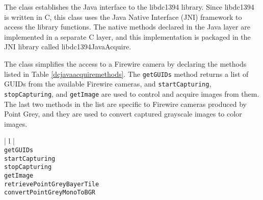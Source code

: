 The \DCJavaAcquire{} class establishes the Java interface to the libdc1394 library. Since libdc1394 is 
written in C, this class uses the Java Native Interface (JNI) framework to access the library functions.
The native methods declared in the Java layer are implemented in a separate C layer, and this
implementation is packaged in the \RD{} JNI library called libdc1394\-Ja\-va\-Ac\-quire. 

The \DCJavaAcquire{} class simplifies the access to a Firewire camera by declaring the methods listed
in Table \ref{dcjavaacquiremethods}. The \texttt{get\-GUIDs} method returns a list of GUIDs from the 
available Firewire cameras, and \texttt{start\-Cap\-tur\-ing}, \texttt{stop\-Cap\-tur\-ing}, and \texttt{get\-Im\-age}
are used to control and acquire images from them. The last two methods in the list are specific to Firewire 
cameras produced by Point Grey, and they are used to convert captured grayscale images to color images.

\begin{table}[ht]
\caption{Public methods in the \DCJavaAcquire{} class}
\begin{center}
\begin{tabular}{| l |}
	\hline 
	 \\
	\hline \hline
	\texttt{getGUIDs} \\
	\texttt{startCapturing} \\
	\texttt{stopCapturing} \\
	\texttt{getImage} \\
	\texttt{retrievePointGreyBayerTile} \\
	\texttt{convertPointGreyMonoToBGR} \\
	\hline
\end{tabular}
\end{center}
\label{dcjavaacquiremethods}
\end{table}